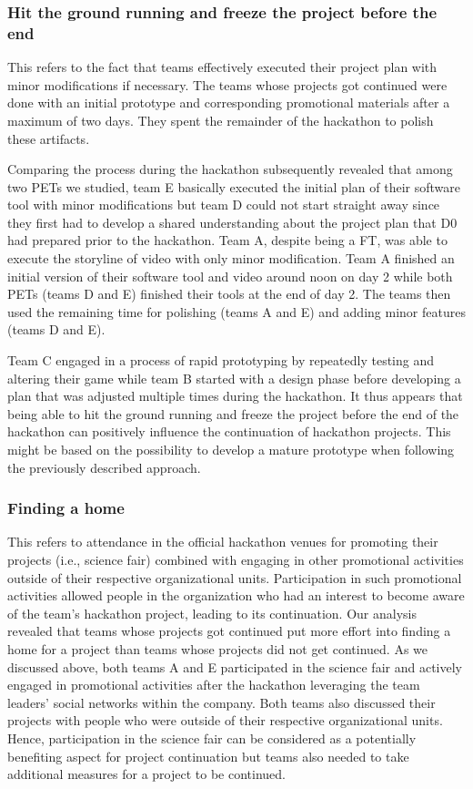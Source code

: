 \documentclass{hcij}
\begin{document}
\subsubsection{Hit the ground running and freeze the project before the end}
This refers to the fact that teams effectively executed their project plan with minor modifications if necessary. The teams whose projects got continued were done with an initial prototype and corresponding promotional materials after a maximum of two days. They spent the remainder of the hackathon to polish these artifacts.

Comparing the process during the hackathon subsequently revealed that among two PETs we studied, team E basically executed the initial plan of their software tool with minor modifications but team D could not start straight away since they first had to develop a shared understanding about the project plan that D0 had prepared prior to the hackathon. Team A, despite being a FT, was able to execute the storyline of video with only minor modification. Team A finished an initial version of their software tool and video around noon on day 2 while both PETs (teams D and E) finished their tools at the end of day 2. The teams then used the remaining time for polishing (teams A and E) and adding minor features (teams D and E).

Team C engaged in a process of rapid prototyping by repeatedly testing and altering their game while team B started with a design phase before developing a plan that was adjusted multiple times during the hackathon. It thus appears that being able to hit the ground running and freeze the project before the end of the hackathon can positively influence the continuation of hackathon projects. This might be based on the possibility to develop a mature prototype when following the previously described approach.

\subsubsection{Finding a home}
This refers to attendance in the official hackathon venues for promoting their projects (i.e., science fair) combined with engaging in other promotional activities outside of their respective organizational units. Participation in such promotional activities allowed people in the organization who had an interest to become aware of the team’s hackathon project, leading to its continuation. Our analysis revealed that teams whose projects got continued put more effort into finding a home for a project than teams whose projects did not get continued. As we discussed above, both teams A and E participated in the science fair and actively engaged in promotional activities after the hackathon leveraging the team leaders’ social networks within the company. Both teams also discussed their projects with people who were outside of their respective organizational units. Hence, participation in the science fair can be considered as a potentially benefiting aspect for project continuation but teams also needed to take additional measures for a project to be continued.
\end{document}
